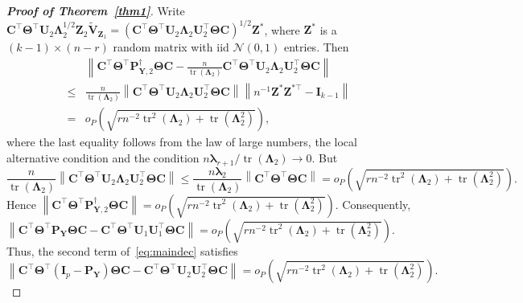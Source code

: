 \documentclass[10pt]{book}
\theoremstyle{definition}
\DeclareMathOperator{\mytr}{tr}
\newcommand{\bZ}{\mathbf{Z}}
\newcommand{\bP}{\mathbf{P}}
\newcommand{\bY}{\mathbf{Y}}
\newcommand{\bC}{\mathbf{C}}
\newcommand{\bI}{\mathbf{I}}
\newcommand{\bU}{\mathbf{U}}
\newcommand{\bV}{\mathbf{V}}
\newcommand{\bfsym}[1]{\ensuremath{\boldsymbol{#1}}}
\def\blambda {\bfsym {\lambda}}
\def\bLambda {\bfsym {\Lambda}}
\def\bTheta {\bfsym {\Theta}}
\begin{document}
\begin{proof}[\textbf{Proof of Theorem~\ref{thm1}}]
Write $\bC^\top \bTheta^\top \bU_2 \bLambda_2^{1/2} \bZ_{2} \tilde{\bV}_{\bZ_1}=(\bC^\top \bTheta^\top \bU_2 \bLambda_2 \bU_2^\top \bTheta \bC)^{1/2} \bZ^*$, where $\bZ^*$ is a $(k-1)\times (n-r)$ random matrix with iid $\mathcal{N}(0,1)$ entries. 
Then
\begin{equation*}
    \begin{split}
        &\left\|
        \bC^\top \bTheta^\top \bP_{\bY,2}^\dagger \bTheta \bC
        -
        \frac{n}{\mytr(\bLambda_2)}\bC^\top \bTheta^\top \bU_{2}\bLambda_2\bU_{2}^\top \bTheta \bC
        \right\|
        \\
        \leq &
        \frac{n}{\mytr(\bLambda_2)}\left\|\bC^\top \bTheta^\top \bU_{2}\bLambda_2\bU_{2}^\top \bTheta \bC
        \right\|
        \left\|
        n^{-1}\bZ^*\bZ^{*\top}-\bI_{k-1}
        \right\|
        \\
=&    
o_P\left(
\sqrt{
        rn^{-2} \mytr^2 (\bLambda_2) + \mytr(\bLambda_2^2)
}
\right)
    ,
    \end{split}
\end{equation*}
where the last equality follows from the law of large numbers, the local alternative condition and the condition $n\blambda_{r+1}/\mytr(\bLambda_2)\to 0$.
But
\begin{equation*}
\frac{n}{\mytr(\bLambda_2)}
        \left\|
        \bC^\top \bTheta^\top \bU_{2}\bLambda_2\bU_{2}^\top \bTheta \bC
        \right\|
        \leq
\frac{n\blambda_2}{\mytr(\bLambda_2)}
        \left\|
        \bC^\top \bTheta^\top  \bTheta \bC
        \right\|
        =
o_P\left(
\sqrt{
        rn^{-2} \mytr^2 (\bLambda_2) + \mytr(\bLambda_2^2)
}
\right).
\end{equation*}
Hence
        $\left\|\bC^\top \bTheta^\top \bP_{\bY,2}^\dagger \bTheta \bC\right\|=
o_P\left(
\sqrt{
        rn^{-2} \mytr^2 (\bLambda_2) + \mytr(\bLambda_2^2)
}
\right)$.
Consequently, 
$
\left\|\bC^\top \bTheta^\top \bP_{\bY} \bTheta \bC-\bC^\top \bTheta^\top \bU_1\bU_1^\top \bTheta \bC\right\|=
o_P\left(
\sqrt{
        rn^{-2} \mytr^2 (\bLambda_2) + \mytr(\bLambda_2^2)
}
\right)
$.
Thus, the second term of~\eqref{eq:maindec} satisfies
\begin{equation}\label{lushang5}
        \left\|
\bC^\top \bTheta^\top (\bI_p-\bP_\bY)\bTheta \bC
        -
        \bC^\top \bTheta^\top \bU_2 \bU_2^\top \bTheta \bC
        \right\|
        =
o_P\left(
\sqrt{
        rn^{-2} \mytr^2 (\bLambda_2) + \mytr(\bLambda_2^2)
}
\right).
\end{equation}





\end{proof}
\end{document}
